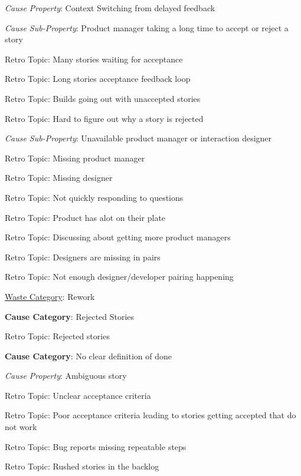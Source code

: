 \quad \quad \textit{Cause Property}: Context Switching from delayed feedback

\quad \quad \quad \textit{Cause Sub-Property}: Product manager taking a long time to accept or reject a story

\quad \quad \quad \quad Retro Topic: Many stories waiting for acceptance

\quad \quad \quad \quad Retro Topic: Long stories acceptance feedback loop

\quad \quad \quad \quad Retro Topic: Builds going out with unaccepted stories

\quad \quad \quad \quad Retro Topic: Hard to figure out why a story is rejected

\quad \quad \quad \textit{Cause Sub-Property}: Unavailable product manager or interaction designer

\quad \quad \quad \quad Retro Topic: Missing product manager

\quad \quad \quad \quad Retro Topic: Missing designer

\quad \quad \quad \quad Retro Topic: Not quickly responding to questions

\quad \quad \quad \quad Retro Topic: Product has alot on their plate

\quad \quad \quad \quad Retro Topic: Discussing about getting more product managers

\quad \quad \quad \quad Retro Topic: Designers are missing in pairs

\quad \quad \quad \quad Retro Topic: Not enough designer/developer pairing happening




\underline{Waste Category}: Rework

\quad \textbf{Cause Category}: Rejected Stories

\quad \quad Retro Topic: Rejected stories

\quad \textbf{Cause Category}: No clear definition of done

\quad \quad \textit{Cause Property}: Ambiguous story

\quad \quad \quad Retro Topic: Unclear acceptance criteria

\quad \quad \quad Retro Topic: Poor acceptance criteria leading to stories getting accepted that do not work

\quad \quad \quad Retro Topic: Bug reports missing repeatable steps

\quad \quad \quad Retro Topic: Rushed stories in the backlog

